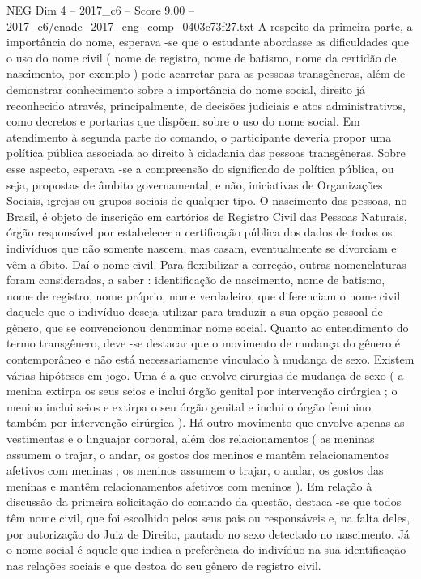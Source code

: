 \begin{textsample}{NEG Dim 4 – 2017\_c6 – Score 9.00 – 2017\_c6/enade\_2017\_eng\_comp\_0403c73f27.txt}
A respeito da primeira parte, a importância do nome, esperava -se que o estudante abordasse as dificuldades que o uso do nome civil ( nome de registro, nome de batismo, nome da certidão de nascimento, por exemplo ) pode acarretar para as pessoas transgêneras, além de demonstrar conhecimento sobre a importância do nome social, direito já reconhecido através, principalmente, de decisões judiciais e atos administrativos, como decretos e portarias que dispõem sobre o uso do nome social.
Em atendimento à segunda parte do comando, o participante deveria propor uma política pública associada ao direito à cidadania das pessoas transgêneras.
Sobre esse aspecto, esperava -se a compreensão do significado de política pública, ou seja, propostas de âmbito governamental, e não, iniciativas de Organizações Sociais, igrejas ou grupos sociais de qualquer tipo.
O nascimento das pessoas, no Brasil, é objeto de inscrição em cartórios de Registro Civil das Pessoas Naturais, órgão responsável por estabelecer a certificação pública dos dados de todos os indivíduos que não somente nascem, mas casam, eventualmente se divorciam e vêm a óbito.
Daí o nome civil.
Para flexibilizar a correção, outras nomenclaturas foram consideradas, a saber : identificação de nascimento, nome de batismo, nome de registro, nome próprio, nome verdadeiro, que diferenciam o nome civil daquele que o indivíduo deseja utilizar para traduzir a sua opção pessoal de gênero, que se convencionou denominar nome social.
Quanto ao entendimento do termo transgênero, deve -se destacar que o movimento de mudança do gênero é contemporâneo e não está necessariamente vinculado à mudança de sexo.
Existem várias hipóteses em jogo.
Uma é a que envolve cirurgias de mudança de sexo ( a menina extirpa os seus seios e inclui órgão genital por intervenção cirúrgica ; o menino inclui seios e extirpa o seu órgão genital e inclui o órgão feminino também por intervenção cirúrgica ).
Há outro movimento que envolve apenas as vestimentas e o linguajar corporal, além dos relacionamentos ( as meninas assumem o trajar, o andar, os gostos dos meninos e mantêm relacionamentos afetivos com meninas ; os meninos assumem o trajar, o andar, os gostos das meninas e mantêm relacionamentos afetivos com meninos ).
Em relação à discussão da primeira solicitação do comando da questão, destaca -se que todos têm nome civil, que foi escolhido pelos seus pais ou responsáveis e, na falta deles, por autorização do Juiz de Direito, pautado no sexo detectado no nascimento.
Já o nome social é aquele que indica a preferência do indivíduo na sua identificação nas relações sociais e que destoa do seu gênero de registro civil.

\end{textsample}
